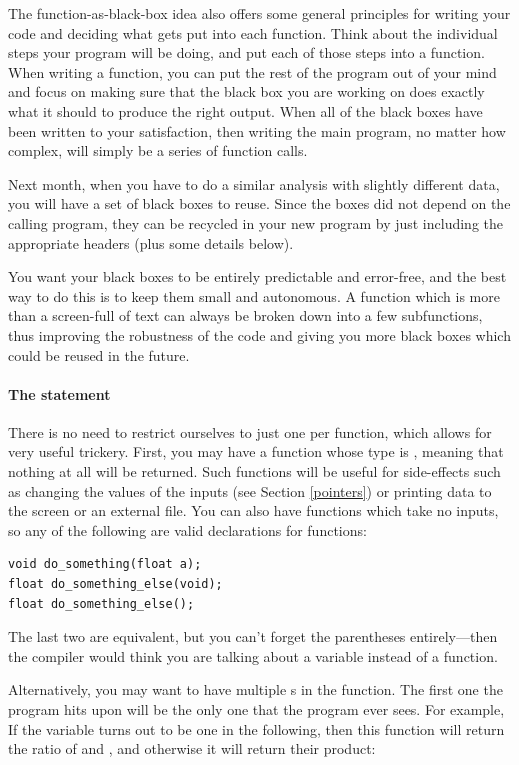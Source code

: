 \documentclass[12pt]{article}
\makeatletter
\def\ttind#1{\index{#1@\cinline{#1}}\cinline{#1}}
\def\ttindex#1{\index{#1@\cinline{#1}}}
\makeatother
\begin{document}
The function-as-black-box idea also offers some general principles for
writing your code and deciding what gets put into each function. Think
about the individual steps your program will be doing, and put each
of those steps into a function. When writing a function, you
can put the rest of the program out of your mind and focus on making
sure that the black box you are working on does exactly what it should
to produce the right output. When all of the black boxes have been written to
your satisfaction, then writing the main program, no matter how complex,
will simply be a series of function calls.

Next month, when you have to do a similar analysis with slightly different
data, you will have a set of black boxes to reuse. Since the boxes did not
depend on the calling program, they can be recycled in your new program
by just including the appropriate headers (plus some details below).

You want your black boxes to be entirely predictable and error-free, and the best
way to do this is to keep them small and autonomous. A function which is more than a
screen-full of text can always be broken down into a few subfunctions,
thus improving the robustness of the code and giving you more black boxes which could be reused in the
future.

\paragraph{The  statement} \ttindex{return} There
is no need to restrict ourselves to just one  per
function, which allows for very useful trickery. First, you may have a
function whose type is \ttind{void}, meaning that nothing at all will be
returned. Such functions will be useful for side-effects such as changing
the values of the inputs (see Section \ref{pointers}) or printing data
to the screen or an external file. You can also have functions which take
no inputs, so any of the following are valid declarations for functions:

\begin{lstlisting}
void do_something(float a);
float do_something_else(void);
float do_something_else();
\end{lstlisting}

The last two are equivalent, but you can't forget the parentheses entirely---then the compiler would
think you are talking about a variable instead of a function.

Alternatively, you may want to have multiple s in the
function. The first one the program hits upon will be the only one that
the program ever sees. For example, If the variable  turns out to
be one in the following, then this function will return the ratio of  and , and otherwise it
will return their product:
\end{document}
